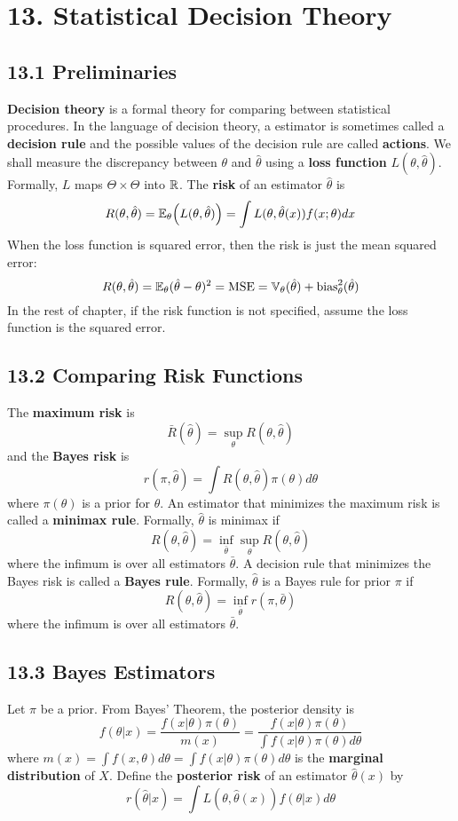 \section*{13. Statistical Decision Theory}\label{statistical-decision-theory}

\subsection*{13.1 Preliminaries}\label{preliminaries}
\textbf{Decision theory} is a formal theory for comparing between
statistical procedures.
In the language of decision theory, a estimator is sometimes called a
\textbf{decision rule} and the possible values of the decision rule are
called \textbf{actions}.
We shall measure the discrepancy between \(\theta\) and \(\hat{\theta}\)
using a \textbf{loss function} \(L(\theta, \hat{\theta})\). Formally,
\(L\) maps \(\Theta \times \Theta\) into \(\mathbb{R}\).
The \textbf{risk} of an estimator \(\hat{\theta}\) is
\[
R(\theta, \hat{\theta}) = \EXP_{\theta} \left( L(\theta, \hat{\theta}) \right)
= \int L(\theta, \hat{\theta}(x)) f(x; \theta) dx
\]
When the loss function is squared error, then the risk is just the mean
squared error:
\[
R(\theta, \hat{\theta}) = \operatorname{\mathbb{E}}_{\theta}(\hat{\theta} - \theta)^{2} = \operatorname{\mathrm{MSE}} = \operatorname{\mathbb{V}}_\theta(\hat{\theta}) + \text{bias}_\theta^{2}(\hat{\theta})
\]
In the rest of chapter, if the risk function is not specified, assume
the loss function is the squared error.

\subsection*{13.2 Comparing Risk
Functions}\label{comparing-risk-functions}
The \textbf{maximum risk} is
\[
\bar{R}(\hat{\theta}) = \sup_\theta R(\theta, \hat{\theta})
\]
and the \textbf{Bayes risk} is
\[
r(\pi, \hat{\theta}) = \int R(\theta, \hat{\theta}) \pi(\theta) d\theta
\]
where \(\pi(\theta)\) is a prior for \(\theta\).
An estimator that minimizes the maximum risk is called a \textbf{minimax
rule}. Formally, \(\hat{\theta}\) is minimax if
\[
R(\theta, \hat{\theta}) = \inf_{\bar{\theta}} \sup_\theta R(\theta, \hat{\theta})
\]
where the infimum is over all estimators \(\bar{\theta}\).
A decision rule that minimizes the Bayes risk is called a \textbf{Bayes
rule}. Formally, \(\hat{\theta}\) is a Bayes rule for prior \(\pi\) if
\[
R(\theta, \hat{\theta}) = \inf_{\bar{\theta}} r(\pi, \bar{\theta})
\]
where the infimum is over all estimators \(\bar{\theta}\).

\subsection*{13.3 Bayes Estimators}\label{bayes-estimators}
Let \(\pi\) be a prior. From Bayes' Theorem, the posterior density is
\[
f(\theta | x) = \frac{f(x | \theta) \pi(\theta)}{m(x)} = \frac{f(x | \theta) \pi(\theta)}{\int f(x | \theta) \pi(\theta) d\theta}
\]
where
\(m(x) = \int f(x, \theta) d\theta = \int f(x | \theta) \pi(\theta) d\theta\)
is the \textbf{marginal distribution} of \(X\). Define the
\textbf{posterior risk} of an estimator \(\hat{\theta}(x)\) by
\[
r(\hat{\theta} | x) = \int L(\theta, \hat{\theta}(x)) f(\theta | x) d\theta
\]


